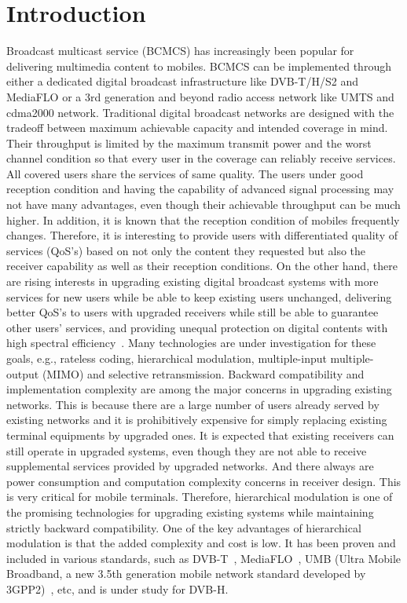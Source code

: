 \documentclass[conference]{IEEEtran}
\begin{document}
\section{Introduction}
Broadcast multicast service (BCMCS) has increasingly been popular
for delivering multimedia content to mobiles. BCMCS can be
implemented through either a dedicated digital broadcast
infrastructure like DVB-T/H/S2 and MediaFLO or a 3rd generation
and beyond radio access network like UMTS and cdma2000 network.
Traditional digital broadcast networks are designed with the
tradeoff between maximum achievable capacity and intended coverage
in mind. Their throughput is limited by the maximum transmit power
and the worst channel condition so that every user in the coverage
can reliably receive services. All covered users share the
services of same quality. The users under good reception condition
and having the capability of advanced signal processing may not
have many advantages, even though their achievable throughput can
be much higher. In addition, it is known that the reception
condition of mobiles frequently changes. Therefore, it is
interesting to provide users with differentiated quality of
services (QoS's) based on not only the content they requested but
also the receiver capability as well as their reception
conditions. On the other hand, there are rising interests in
upgrading existing digital broadcast systems with more services
for new users while be able to keep existing users unchanged,
delivering better QoS's to users with upgraded receivers while
still be able to guarantee other users' services, and providing
unequal protection on digital contents with high spectral
efficiency~\cite{DVB,MediaFLO,Jiang05,UMB}. Many technologies are
under investigation for these goals, e.g., rateless coding,
hierarchical modulation, multiple-input multiple-output (MIMO) and
selective retransmission. Backward compatibility and
implementation complexity are among the major concerns in
upgrading existing networks. This is because there are a large
number of users already served by existing networks and it is
prohibitively expensive for simply replacing existing terminal
equipments by upgraded ones. It is expected that existing
receivers can still operate in upgraded systems, even though they
are not able to receive supplemental services provided by upgraded
networks. And there always are power consumption and computation
complexity concerns in receiver design. This is very critical for
mobile terminals. Therefore, hierarchical modulation is one of the
promising technologies for upgrading existing systems while
maintaining strictly backward compatibility. One of the key
advantages of hierarchical modulation is that the added complexity
and cost is low. It has been proven and included in various
standards, such as DVB-T~\cite{DVB}, MediaFLO~\cite{MediaFLO}, UMB
(Ultra Mobile Broadband, a new 3.5th generation mobile network
standard developed by 3GPP2)~\cite{UMB}, etc, and is under study
for DVB-H.
\end{document}
